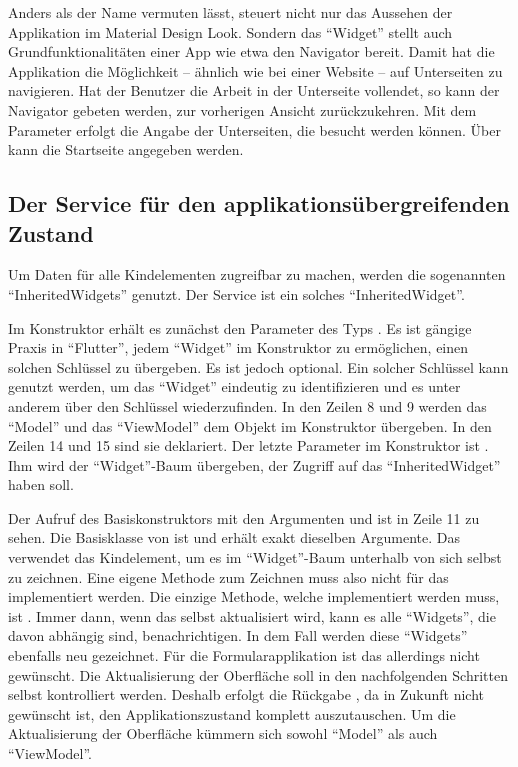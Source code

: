 Anders als der Name vermuten lässt, steuert  nicht nur das Aussehen der Applikation im Material Design Look.
Sondern das \enquote{Widget} stellt auch Grundfunktionalitäten einer App wie etwa den Navigator bereit.
Damit hat die Applikation die Möglichkeit -- ähnlich wie bei einer Website -- auf Unterseiten zu navigieren.
Hat der Benutzer die Arbeit in der Unterseite vollendet, so kann der Navigator gebeten werden, zur vorherigen Ansicht zurückzukehren.
 Mit dem Parameter   erfolgt die Angabe der Unterseiten, die besucht werden können.
Über   kann die Startseite angegeben werden.



\subsection{Der Service für den applikationsübergreifenden Zustand}

Um Daten für alle Kindelementen zugreifbar zu machen, werden die sogenannten \enquote{InheritedWidgets} genutzt.
Der Service  \Lst{\ref{lst:Schritt1DerServiceAppState}} ist ein solches \enquote{InheritedWidget}.

Im Konstruktor erhält es zunächst den Parameter des Typs  .
Es ist gängige Praxis in \enquote{Flutter}, jedem \enquote{Widget} im Konstruktor zu ermöglichen, einen solchen Schlüssel zu übergeben.
Es ist jedoch optional.
 Ein solcher Schlüssel kann genutzt werden, um das \enquote{Widget} eindeutig zu identifizieren und es unter anderem über den Schlüssel wiederzufinden.
In den Zeilen 8 und 9 werden das \enquote{Model} und das \enquote{ViewModel} dem Objekt im Konstruktor übergeben.
In den Zeilen 14 und 15 sind sie deklariert.
Der letzte Parameter im Konstruktor ist .
Ihm wird der \enquote{Widget}-Baum übergeben, der Zugriff auf das \enquote{InheritedWidget} haben soll.

Der Aufruf des Basiskonstruktors mit den Argumenten  und  ist in Zeile 11 zu sehen.
Die Basisklasse von  ist  und erhält exakt dieselben Argumente.
 Das  verwendet das Kindelement, um es im \enquote{Widget}-Baum unterhalb von sich selbst zu zeichnen.
 Eine eigene Methode zum Zeichnen muss also nicht für das  implementiert werden.
Die einzige Methode, welche implementiert werden muss, ist  .
Immer dann, wenn das  selbst aktualisiert wird, kann es alle \enquote{Widgets}, die davon abhängig sind, benachrichtigen.
 In dem Fall werden diese  \enquote{Widgets} ebenfalls neu gezeichnet.
Für die Formularapplikation ist das allerdings nicht gewünscht.
Die Aktualisierung der Oberfläche soll in den nachfolgenden Schritten selbst kontrolliert werden.
Deshalb erfolgt die Rückgabe , da in Zukunft nicht gewünscht ist, den Applikationszustand komplett auszutauschen.
 Um die  Aktualisierung  der Oberfläche  kümmern sich sowohl \enquote{Model} als auch \enquote{ViewModel}.

